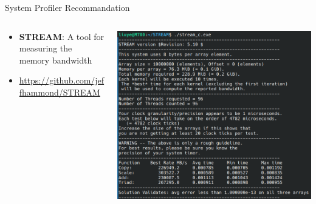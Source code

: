 \begin{frame}{System Profiler Recommandation}
    \begin{columns}
        \begin{column}{0.5\textwidth}
            \begin{itemize}
                \item \textbf{STREAM}: A tool for measuring the memory bandwidth
                \item \footnotesize{\url{https://github.com/jeffhammond/STREAM}}
            \end{itemize}
        \end{column}
        \begin{column}{0.5\textwidth}
            \centering
            \includegraphics[width=\textwidth]{img/stream.png}
        \end{column}
    \end{columns}
\end{frame}

